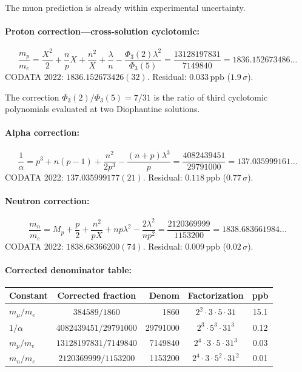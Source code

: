 \documentclass[12pt,a4paper]{article}
\theoremstyle{definition}
\newcommand{\Phithree}{\Phi_3}
\newcommand{\ppb}{\,\mathrm{ppb}}
\begin{document}
The muon prediction is already within experimental uncertainty.

\paragraph{Proton correction---cross-solution cyclotomic:}
\begin{equation}\label{eq:proton-corr}
  \frac{m_p}{m_e} = \frac{X^2}{2} + \frac{n}{p}X + \frac{n^2}{X}
    + \frac{\lambda}{n} - \frac{\Phithree(2)\lambda^2}{\Phithree(5)}
  = \frac{13128197831}{7149840} = 1836.152673486\ldots
\end{equation}
CODATA 2022: $1836.152673426(32)$. Residual: $0.033\ppb$ ($1.9\,\sigma$).

The correction $\Phithree(2)/\Phithree(5) = 7/31$ is the ratio of third
cyclotomic polynomials evaluated at two Diophantine solutions.

\paragraph{Alpha correction:}
\begin{equation}\label{eq:alpha-corr}
  \frac{1}{\alpha} = p^3 + n(p-1) + \frac{n^2}{2p^3}
    - \frac{(n+p)\lambda^3}{p}
  = \frac{4082439451}{29791000} = 137.035999161\ldots
\end{equation}
CODATA 2022: $137.035999177(21)$. Residual: $0.118\ppb$ ($0.77\,\sigma$).

\paragraph{Neutron correction:}
\begin{equation}\label{eq:neutron-corr}
  \frac{m_n}{m_e} = M_p + \frac{p}{2} + \frac{n^2}{pX} + np\lambda^2
    - \frac{2\lambda^2}{np^2}
  = \frac{2120369999}{1153200} = 1838.683661984\ldots
\end{equation}
CODATA 2022: $1838.68366200(74)$. Residual: $0.009\ppb$ ($0.02\,\sigma$).

\paragraph{Corrected denominator table:}
\begin{center}
\begin{tabular}{lcrcc}
\toprule
Constant & Corrected fraction & Denom & Factorization & ppb \\
\midrule
$m_\mu/m_e$ & $384589/1860$          &     1860 & $2^2 \cdot 3 \cdot 5 \cdot 31$ & 15.1 \\
$1/\alpha$  & $4082439451/29791000$  & 29791000 & $2^3 \cdot 5^3 \cdot 31^3$ & 0.12 \\
$m_p/m_e$   & $13128197831/7149840$  &  7149840 & $2^4 \cdot 3 \cdot 5 \cdot 31^3$ & 0.03 \\
$m_n/m_e$   & $2120369999/1153200$   &  1153200 & $2^4 \cdot 3 \cdot 5^2 \cdot 31^2$ & 0.01 \\
\bottomrule
\end{tabular}
\end{center}
\end{document}
